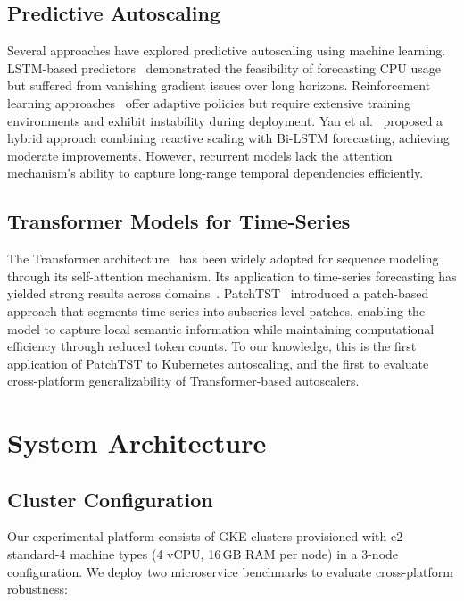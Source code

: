 \documentclass[conference]{IEEEtran}
\begin{document}
\subsection{Predictive Autoscaling}
Several approaches have explored predictive autoscaling using machine learning. LSTM-based predictors~\cite{imdoukh2020machine} demonstrated the feasibility of forecasting CPU usage but suffered from vanishing gradient issues over long horizons. Reinforcement learning approaches~\cite{qiu2020firm} offer adaptive policies but require extensive training environments and exhibit instability during deployment. Yan et al.~\cite{yan2021hansel} proposed a hybrid approach combining reactive scaling with Bi-LSTM forecasting, achieving moderate improvements. However, recurrent models lack the attention mechanism's ability to capture long-range temporal dependencies efficiently.

\subsection{Transformer Models for Time-Series}
The Transformer architecture~\cite{vaswani2017attention} has been widely adopted for sequence modeling through its self-attention mechanism. Its application to time-series forecasting has yielded strong results across domains~\cite{wen2023transformers}. PatchTST~\cite{nie2023patchtst} introduced a patch-based approach that segments time-series into subseries-level patches, enabling the model to capture local semantic information while maintaining computational efficiency through reduced token counts. To our knowledge, this is the first application of PatchTST to Kubernetes autoscaling, and the first to evaluate cross-platform generalizability of Transformer-based autoscalers.

\section{System Architecture}\label{sec:architecture}

\subsection{Cluster Configuration}
Our experimental platform consists of GKE clusters provisioned with e2-standard-4 machine types (4 vCPU, 16\,GB RAM per node) in a 3-node configuration. We deploy two microservice benchmarks to evaluate cross-platform robustness:
\end{document}

